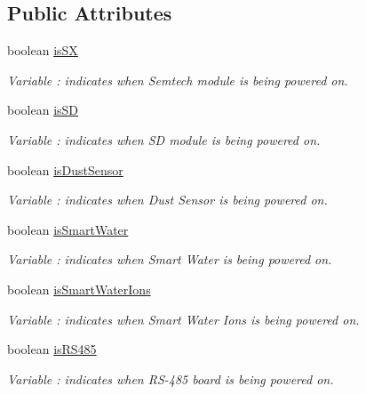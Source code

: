 \subsection*{Public Attributes}
\begin{DoxyCompactItemize}
\item 
boolean \hyperlink{class_wasp_s_p_i_a859e91c0a90cae6c14c5a0ca97c3ceb0}{is\+SX}
\begin{DoxyCompactList}\small\item\em Variable \+: indicates when Semtech module is being powered on. \end{DoxyCompactList}\item 
boolean \hyperlink{class_wasp_s_p_i_af25524796d63dabc614299f9a0aab693}{is\+SD}
\begin{DoxyCompactList}\small\item\em Variable \+: indicates when SD module is being powered on. \end{DoxyCompactList}\item 
boolean \hyperlink{class_wasp_s_p_i_acbe8b5e5ae2b94623730ce386f7e4777}{is\+Dust\+Sensor}
\begin{DoxyCompactList}\small\item\em Variable \+: indicates when Dust Sensor is being powered on. \end{DoxyCompactList}\item 
boolean \hyperlink{class_wasp_s_p_i_a925f2e476409b686e9a24c045ad9e79a}{is\+Smart\+Water}
\begin{DoxyCompactList}\small\item\em Variable \+: indicates when Smart Water is being powered on. \end{DoxyCompactList}\item 
boolean \hyperlink{class_wasp_s_p_i_afd972ccff99b8ae3c6f9b3a15c1a92b7}{is\+Smart\+Water\+Ions}
\begin{DoxyCompactList}\small\item\em Variable \+: indicates when Smart Water Ions is being powered on. \end{DoxyCompactList}\item 
boolean \hyperlink{class_wasp_s_p_i_ab5fb0f5a6e2a31fee2edf6f6319710a6}{is\+R\+S485}
\begin{DoxyCompactList}\small\item\em Variable \+: indicates when R\+S-\/485 board is being powered on. \end{DoxyCompactList}\end{DoxyCompactItemize}


